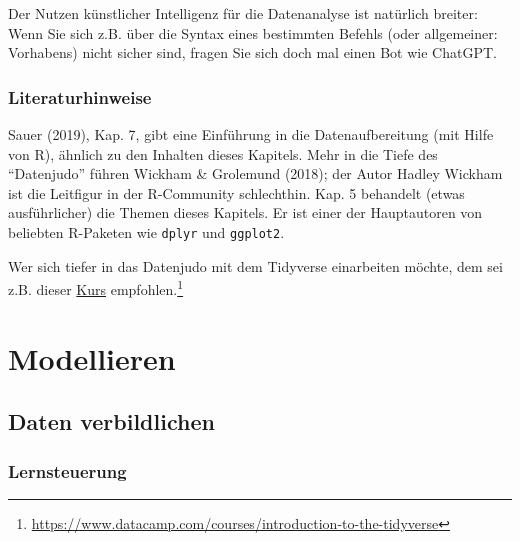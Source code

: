 \documentclass[
  letterpaper,
]{scrbook}
\theoremstyle{definition}
\theoremstyle{definition}
\theoremstyle{definition}
\theoremstyle{remark}
\begin{document}
\begin{tcolorbox}[enhanced jigsaw, left=2mm, toptitle=1mm, toprule=.15mm, rightrule=.15mm, leftrule=.75mm, breakable, colbacktitle=quarto-callout-note-color!10!white, colback=white, coltitle=black, bottomtitle=1mm, opacityback=0, title=\textcolor{quarto-callout-note-color}{\faInfo}\hspace{0.5em}{Hinweis}, colframe=quarto-callout-note-color-frame, arc=.35mm, opacitybacktitle=0.6, bottomrule=.15mm, titlerule=0mm]

Der Nutzen künstlicher Intelligenz für die Datenanalyse ist natürlich
breiter: Wenn Sie sich z.B. über die Syntax eines bestimmten Befehls
(oder allgemeiner: Vorhabens) nicht sicher sind, fragen Sie sich doch
mal einen Bot wie ChatGPT.

\end{tcolorbox}

\section{Literaturhinweise}\label{literaturhinweise-2}

Sauer (2019), Kap. 7, gibt eine Einführung in die Datenaufbereitung (mit
Hilfe von R), ähnlich zu den Inhalten dieses Kapitels. Mehr in die Tiefe
des ``Datenjudo'' führen Wickham \& Grolemund (2018); der Autor Hadley
Wickham ist die Leitfigur in der R-Community schlechthin. Kap. 5
behandelt (etwas ausführlicher) die Themen dieses Kapitels. Er ist einer
der Hauptautoren von beliebten R-Paketen wie \texttt{dplyr} und
\texttt{ggplot2}.

Wer sich tiefer in das Datenjudo mit dem Tidyverse einarbeiten möchte,
dem sei z.B. dieser
\href{https://www.datacamp.com/courses/introduction-to-the-tidyverse}{Kurs}
empfohlen.\footnote{\url{https://www.datacamp.com/courses/introduction-to-the-tidyverse}}

\part{Modellieren}

\chapter{Daten verbildlichen}\label{daten-verbildlichen}

\section{Lernsteuerung}\label{lernsteuerung-3}
\end{document}
